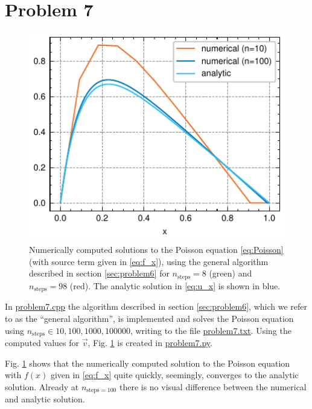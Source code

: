 \documentclass[english,notitlepage,reprint,nofootinbib]{revtex4-2}  %
\begin{document}
\section{Problem 7} \label{sec:problem7}
\begin{figure}[h!]
    \includegraphics{Figs/problem7.pdf}
    \caption{Numerically computed solutions to the Poisson equation \eqref{eq:Poisson} (with source term given in \eqref{eq:f_x}), using the general algorithm described in section \ref{sec:problem6} for \(n_{\text{steps}}=8\) (green) and \(n_{\text{steps}}=98\) (red). The analytic solution in \eqref{eq:u_x} is shown in blue.}
    \label{fig:v_x}
\end{figure}
In \href{https://github.com/isakrukan/FYS4150/blob/main/Project1/Code/problem7.cpp}{problem7.cpp} the algorithm described in section \ref{sec:problem6}, which we refer to as the ``general algorithm'', is implemented and solves the Poisson equation using \({n_{\text{steps}}\in {10, 100, 1000, 100000}}\), writing to the file \href{https://github.com/isakrukan/FYS4150/blob/main/Project1/Code/problem7.txt}{problem7.txt}. Using the computed values for \(\vec{v}\), Fig. \ref{fig:v_x} is created in \href{https://github.com/isakrukan/FYS4150/blob/main/Project1/Code/problem7.py}{problem7.py}.

Fig. \ref{fig:v_x} shows that the numerically computed solution to the Poisson equation with \(f(x)\) given in \eqref{eq:f_x} quite quickly, seemingly, converges to the analytic solution. Already at \(n_{\text{steps}=100}\) there is no visual difference between the numerical and analytic solution.
\end{document}
